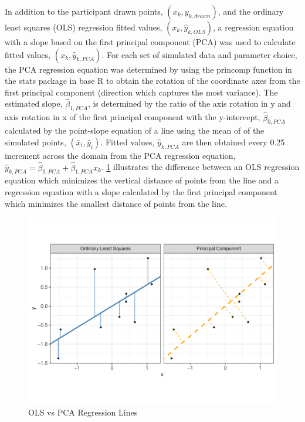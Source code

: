 \documentclass[print]{nuthesis}
\begin{document}
In addition to the participant drawn points, \((x_k, y_{k,drawn})\), and the ordinary least squares (OLS) regression fitted values, \((x_k, \hat y_{k,OLS})\), a regression equation with a slope based on the first principal component (PCA) was used to calculate fitted values, \((x_k, \hat y_{k,PCA})\).
For each set of simulated data and parameter choice, the PCA regression equation was determined by using the princomp function in the stats package in base R to obtain the rotation of the coordinate axes from the first principal component (direction which captures the most variance).
The estimated slope, \(\hat\beta_{1,PCA}\), is determined by the ratio of the axis rotation in y and axis rotation in x of the first principal component with the y-intercept, \(\hat\beta_{0,PCA}\) calculated by the point-slope equation of a line using the mean of of the simulated points, \((\bar x_i, \bar y_i)\).
Fitted values, \(\hat y_{k,PCA}\) are then obtained every 0.25 increment across the domain from the PCA regression equation, \(\hat y_{k,PCA} = \hat\beta_{0,PCA} + \hat\beta_{1,PCA} x_k\).
\cref{fig:ols-vs-pca-example} illustrates the difference between an OLS regression equation which minimizes the vertical distance of points from the line and a regression equation with a slope calculated by the first principal component which minimizes the smallest distance of points from the line.

\begin{figure}[tbp]

{\centering \includegraphics[width=1\linewidth,]{thesis_files/figure-latex/ols-vs-pca-example-1} 

}

\caption{OLS vs PCA Regression Lines}\label{fig:ols-vs-pca-example}
\end{figure}
\end{document}

